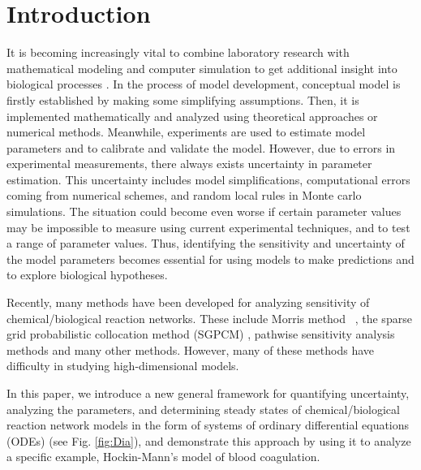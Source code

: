 
\section*{Introduction}
\label{sec:intro}


 It is becoming increasingly vital to combine
laboratory research with mathematical modeling and computer
simulation to get additional insight into biological processes
\cite{AssHer06,Arn06,CNX,HRAMMA,LGWNC,
LZV,MCNJY,PWSNCM,SJKA1,SJKA2,SCBM,TPMA,WJKA}. %
In the process of model development, conceptual model is firstly
established by making some simplifying
assumptions. Then, it is implemented mathematically and analyzed using
theoretical approaches or numerical methods. Meanwhile,
experiments are used to estimate model parameters
and to calibrate
 and validate the model. However, due to errors in experimental
measurements, there always exists uncertainty in parameter
estimation. This uncertainty includes model simplifications,
computational errors coming from numerical schemes, and random local
rules in Monte carlo simulations. The situation could become even
worse if certain parameter values may be impossible to measure using
current experimental techniques, and to test a range of parameter
values. %
Thus, identifying the sensitivity and uncertainty
of the model parameters becomes essential for using models to make
predictions and to explore biological hypotheses.


Recently, many methods have been developed for analyzing sensitivity of chemical/biological reaction networks. These include Morris method ~\cite{Morris91}, the sparse grid
probabilistic collocation method (SGPCM) \cite{DBJSH, LinAMTAWR,
LinAMTJSC}, pathwise sensitivity analysis methods \cite{PKV13} and many other methods.
However, many of these methods have difficulty in studying high-dimensional models.

In this paper, we introduce a new general framework for quantifying
uncertainty, analyzing the parameters, and determining steady states
of chemical/biological reaction network models in the form of systems of ordinary differential equations (ODEs) (see Fig. \ref{fig:Dia}),
and demonstrate this
approach by using it to analyze a specific example, Hockin-Mann's model \cite{HocJon02} of blood coagulation. 

